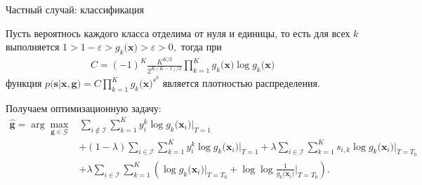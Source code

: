\documentclass[9pt,pdf,hyperref={unicode}]{beamer}
\begin{document}
\begin{frame}{Частный случай: классификация}
\justifying
\begin{theorem}[Грабовой 2020]
\label{theorem:st:dist}
Пусть вероятнось каждого класса отделима от нуля и единицы, то есть для всех $k$ выполняется $1 > 1- \varepsilon > g_k\bigr(\mathbf{x}\bigr) > \varepsilon > 0,$ тогда при
\begin{gather}
C=\left(-1\right)^{K}\frac{K^{K/2}}{2^{K(K-1)/2}}\prod_{k=1}^{K}g_k\bigr(\mathbf{x}\bigr)\log g_k\bigr(\mathbf{x}\bigr)
\end{gather}
функция $p\bigr(\mathbf{s}|\mathbf{x}, \mathbf{g}\bigr) = C\prod_{k=1}^{K}g_k\bigr(\mathbf{x}\bigr)^{s^k}$ является плотностью распределения.
\end{theorem}

Получаем оптимизационную задачу:
\[
\begin{aligned}
\hat{\mathbf{g}} = \arg\max_{\mathbf{g}\in \mathcal{G}} & \sum_{i\not\in \mathcal{I}}\sum_{k=1}^{K}y_i^k\log g_k\bigr(\mathbf{x}_i\bigr)\bigr|_{T=1} \\
&+ \left(1-\lambda\right)\sum_{i\in \mathcal{I}}\sum_{k=1}^{K}y_i^k\log g_k\bigr(\mathbf{x}_i\bigr)\bigr|_{T=1} + \lambda\sum_{i\in \mathcal{I}}\sum_{k=1}^{K}s_{i,k}\log g_k\bigr(\mathbf{x}_i\bigr)\bigr|_{T=T_0} \\
&+ \lambda \sum_{i\in \mathcal{I}}\sum_{k=1}^{K}\left(\log g_k\bigr(\mathbf{x}_i\bigr)\bigr|_{T=T_0} + \log\log\frac{1}{g_k\bigr(\mathbf{x}_i\bigr)}\bigr|_{T=T_0}\right).
\end{aligned}
\]
\end{frame}
\end{document}
